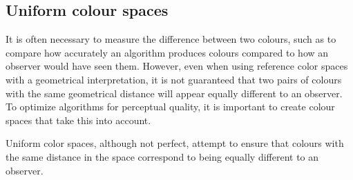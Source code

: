\subsection{Uniform colour spaces}

It is often necessary to measure the difference between two colours, such as to compare how accurately an algorithm produces colours compared to how an observer would have seen them. However, even when using reference color spaces with a geometrical interpretation, it is not guaranteed that two pairs of colours with the same geometrical distance will appear equally different to an observer. To optimize algorithms for perceptual quality, it is important to create colour spaces that take this into account.

Uniform color spaces, although not perfect, attempt to ensure that colours with the same distance in the space correspond to being equally different to an observer.

